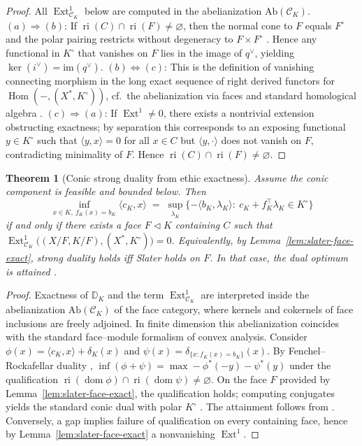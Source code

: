 \documentclass[12pt]{article}
\newcommand{\Hom}{\operatorname{Hom}}
\newcommand{\Ext}{\operatorname{Ext}}
\theoremstyle{plain}
\newtheorem{theorem}{Theorem}[section]
\theoremstyle{definition}
\theoremstyle{remark}
\numberwithin{equation}{section}
\begin{document}
\begin{proof}
All $\Ext^1_{\mathcal C_K}$ below are computed in the abelianization
$\mathrm{Ab}(\mathcal C_K)$.$(a)\Rightarrow(b)$: If $\operatorname{ri}(C)\cap \operatorname{ri}(F)\neq \varnothing$, then the normal cone to $F$ equals $F^\circ$ and the polar pairing restricts without degeneracy to $F\times F^\circ$ \cite{Rockafellar1970}. Hence any functional in $K^\circ$ that vanishes on $F$ lies in the image of $q^\vee$, yielding $\ker(i^\vee)=\mathrm{im}(q^\vee)$.
$(b)\Leftrightarrow(c)$: This is the definition of vanishing connecting morphism in the long exact sequence of right derived functors for $\Hom(-,(X^*,K^\circ))$, cf.\ the abelianization via faces and standard homological algebra \cite{Weibel1994}.
$(c)\Rightarrow(a)$: If $\Ext^1\neq 0$, there exists a nontrivial extension obstructing exactness; by separation \cite{Rockafellar1970} this corresponds to an exposing functional $y\in K^\circ$ such that $\langle y,x\rangle=0$ for all $x\in C$ but $\langle y,\cdot\rangle$ does not vanish on $F$, contradicting minimality of $F$. Hence $\operatorname{ri}(C)\cap \operatorname{ri}(F)\neq \varnothing$.
\end{proof}

\begin{theorem}[Conic strong duality from ethic exactness]\label{thm:conic-strong-duality-ethic}
Assume the conic component is feasible and bounded below. Then
\[
\inf_{x\in K,\ f_K(x)=b_K}\langle c_K,x\rangle \;=\; \sup_{\lambda_K}\{-\langle b_K,\lambda_K\rangle:\ c_K+f_K^\top\lambda_K\in K^\circ\}
\]
if and only if there exists a face $F\triangleleft K$ containing $C$ such that $\Ext^1_{\mathcal C_K}\big((X/F,K/F),(X^*,K^\circ)\big)=0$. Equivalently, by Lemma~\ref{lem:slater-face-exact}, strong duality holds iff Slater holds on $F$. In that case, the dual optimum is attained \cite{Rockafellar1970}.
\end{theorem}

\begin{proof}
Exactness of $\mathbb D_K$ and the term 
$\Ext^1_{\mathcal C_K}$ are interpreted inside the abelianization 
$\mathrm{Ab}(\mathcal C_K)$ of the face category, where kernels and cokernels of 
face inclusions are freely adjoined. 
In finite dimension this abelianization coincides with the standard 
face–module formalism of convex analysis.
Consider $\phi(x)=\langle c_K,x\rangle+\delta_{K}(x)$ and $\psi(x)=\delta_{\{x: f_K(x)=b_K\}}(x)$. By Fenchel–Rockafellar duality \cite{Rockafellar1970}, $\inf(\phi+\psi)=\max -\phi^*(-y)-\psi^*(y)$ under the qualification $\operatorname{ri}(\operatorname{dom}\phi)\cap \operatorname{ri}(\operatorname{dom}\psi)\neq\varnothing$. On the face $F$ provided by Lemma~\ref{lem:slater-face-exact}, the qualification holds; computing conjugates yields the standard conic dual with polar $K^\circ$ \cite{Rockafellar1970}. The attainment follows from \cite{Rockafellar1970}. Conversely, a gap implies failure of qualification on every containing face, hence by Lemma~\ref{lem:slater-face-exact} a nonvanishing $\Ext^1$.
\end{proof}
\end{document}
